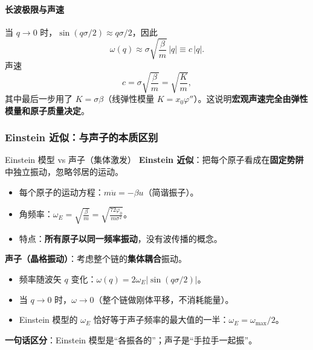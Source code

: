 \paragraph{长波极限与声速}

当 $q \to 0$ 时，$\sin(q\sigma/2) \approx q\sigma/2$，因此
\[
  \omega(q) \approx \sigma\sqrt{\frac{\beta}{m}}\, |q| \equiv c\, |q|.
\]
声速
\[
  \boxed{ c = \sigma\sqrt{\frac{\beta}{m}} = \sqrt{\frac{K}{m}} },
\]
其中最后一步用了 $K = \sigma\beta$（线弹性模量 $K = x_0\varphi''$）。这说明\textbf{宏观声速完全由弹性模量和原子质量决定}。

\subsubsection{Einstein 近似：与声子的本质区别}

\begin{modelbox}{Einstein 模型 vs 声子（集体激发）}
\textbf{Einstein 近似}：把每个原子看成在\textbf{固定势阱}中独立振动，忽略邻居的运动。
\begin{itemize}[nosep]
  \item 每个原子的运动方程：$m\ddot{u} = -\beta u$（简谐振子）。
  \item 角频率：$\displaystyle \omega_E = \sqrt{\frac{\beta}{m}} = \sqrt{\frac{72\varphi_0}{m\sigma^2}}$。
  \item 特点：\textbf{所有原子以同一频率振动}，没有波传播的概念。
\end{itemize}

\textbf{声子（晶格振动）}：考虑整个链的\textbf{集体耦合}振动。
\begin{itemize}[nosep]
  \item 频率随波矢 $q$ 变化：$\omega(q) = 2\omega_E |\sin(q\sigma/2)|$。
  \item 当 $q \to 0$ 时，$\omega \to 0$（整个链做刚体平移，不消耗能量）。
  \item Einstein 模型的 $\omega_E$ 恰好等于声子频率的最大值的一半：$\omega_E = \omega_{\max}/2$。
\end{itemize}

\textbf{一句话区分}：Einstein 模型是``各振各的''；声子是``手拉手一起振''。
\end{modelbox}
